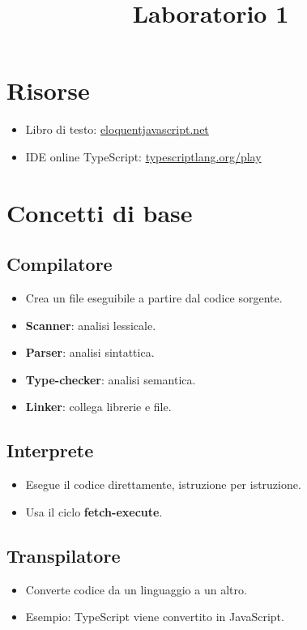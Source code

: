 \documentclass[12pt]{article}
\title{Laboratorio 1}
\date{}
\let\oldsection\section
\renewcommand{\section}{\clearpage\oldsection}
\begin{document}
\maketitle
\tableofcontents
\section{Risorse}
\begin{itemize}
  \item Libro di testo: \href{https://eloquentjavascript.net}{eloquentjavascript.net}
  \item IDE online TypeScript: \href{https://www.typescriptlang.org/play}{typescriptlang.org/play}
\end{itemize}

\section{Concetti di base}

\subsection{Compilatore}
\begin{itemize}
  \item Crea un file eseguibile a partire dal codice sorgente.
  \item \textbf{Scanner}: analisi lessicale.
  \item \textbf{Parser}: analisi sintattica.
  \item \textbf{Type-checker}: analisi semantica.
  \item \textbf{Linker}: collega librerie e file.
\end{itemize}

\subsection{Interprete}
\begin{itemize}
  \item Esegue il codice direttamente, istruzione per istruzione.
  \item Usa il ciclo \textbf{fetch-execute}.
\end{itemize}

\subsection{Transpilatore}
\begin{itemize}
  \item Converte codice da un linguaggio a un altro.
  \item Esempio: TypeScript viene convertito in JavaScript.
\end{itemize}
\end{document}

